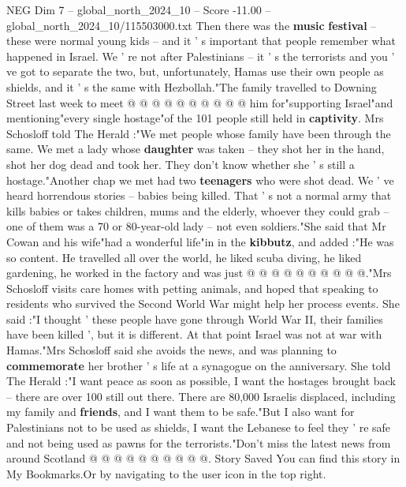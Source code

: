 \begin{textsample}{NEG Dim 7 – global\_north\_2024\_10 – Score -11.00 – global\_north\_2024\_10/115503000.txt}
Then there was the \textbf{music} \textbf{festival} -- these were normal young kids -- and it ' s important that people remember what happened in Israel.
We ' re not after Palestinians -- it ' s the terrorists and you ' ve got to separate the two, but, unfortunately, Hamas use their own people as shields, and it ' s the same with Hezbollah."The family travelled to Downing Street last week to meet @ @ @ @ @ @ @ @ @ @ him for"supporting Israel"and mentioning"every single hostage"of the 101 people still held in \textbf{captivity}.
Mrs Schosloff told The Herald :"We met people whose family have been through the same.
We met a lady whose \textbf{daughter} was taken -- they shot her in the hand, shot her dog dead and took her.
They don't know whether she ' s still a hostage."Another chap we met had two \textbf{teenagers} who were shot dead.
We ' ve heard horrendous stories -- babies being killed.
That ' s not a normal army that kills babies or takes children, mums and the elderly, whoever they could grab -- one of them was a 70 or 80-year-old lady -- not even soldiers."She said that Mr Cowan and his wife"had a wonderful life"in in the \textbf{kibbutz}, and added :"He was so content.
He travelled all over the world, he liked scuba diving, he liked gardening, he worked in the factory and was just @ @ @ @ @ @ @ @ @ @."Mrs Schosloff visits care homes with petting animals, and hoped that speaking to residents who survived the Second World War might help her process events.
She said :"I thought ' these people have gone through World War II, their families have been killed ', but it is different.
At that point Israel was not at war with Hamas."Mrs Schosloff said she avoids the news, and was planning to \textbf{commemorate} her brother ' s life at a synagogue on the anniversary.
She told The Herald :"I want peace as soon as possible, I want the hostages brought back -- there are over 100 still out there.
There are 80,000 Israelis displaced, including my family and \textbf{friends}, and I want them to be safe."But I also want for Palestinians not to be used as shields, I want the Lebanese to feel they ' re safe and not being used as pawns for the terrorists."Don't miss the latest news from around Scotland @ @ @ @ @ @ @ @ @ @.
Story Saved You can find this story in My Bookmarks.Or by navigating to the user icon in the top right.

\end{textsample}
